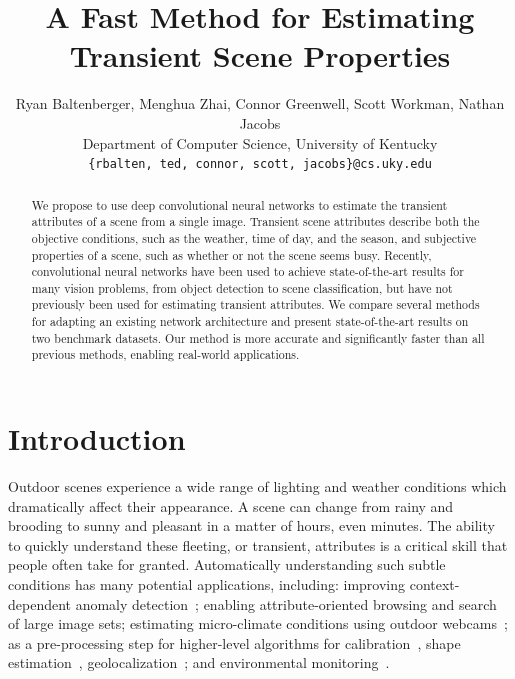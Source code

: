 \documentclass[10pt,twocolumn,letterpaper]{article}
\begin{document}
\title{A Fast Method for Estimating Transient Scene Properties}


\author{Ryan Baltenberger, Menghua Zhai, Connor Greenwell, Scott Workman, Nathan Jacobs \\
  \vspace{-.75em} 
  Department of Computer Science, University of Kentucky \\
  {\tt\small \{rbalten, ted, connor, scott, jacobs\}@cs.uky.edu}
}

\maketitle
\ifwacvfinal\thispagestyle{empty}\fi


\begin{abstract}

We propose to use deep convolutional neural networks to estimate the
transient attributes of a scene from a single image.  Transient scene
attributes describe both the objective conditions, such as the
weather, time of day, and the season, and subjective properties of a
scene, such as whether or not the scene seems busy. Recently,
convolutional neural networks have been used to achieve
state-of-the-art results for many vision problems, from object
detection to scene classification, but have not previously been used
for estimating transient attributes. We compare several methods for
adapting an existing network architecture and present state-of-the-art
results on two benchmark datasets. Our method is more accurate and
significantly faster than all previous methods, enabling real-world
applications. 

\end{abstract}

\section{Introduction}
Outdoor scenes experience a wide range of lighting and weather conditions which
dramatically affect their appearance. A scene can change from rainy and
brooding to sunny and pleasant in a matter of hours, even minutes. The ability
to quickly understand these fleeting, or transient, attributes is a critical
skill that people often take for granted. Automatically understanding such
subtle conditions has many potential applications, including: improving
context-dependent anomaly detection~\cite{abrams12lost}; enabling
attribute-oriented browsing and search of large image
sets\cite{jacobs07amos,skyfinder}; estimating micro-climate conditions using
outdoor webcams~\cite{islam13webcamweather}; as a pre-processing step for
higher-level algorithms for
calibration~\cite{jacobs13cloudcalibration,workman2014rainbow}, shape
estimation~\cite{heliometric,abramsheliometric},
geolocalization~\cite{jacobs07geolocate}; and  environmental
monitoring~\cite{jacobs09webcamgis}. 
\end{document}
